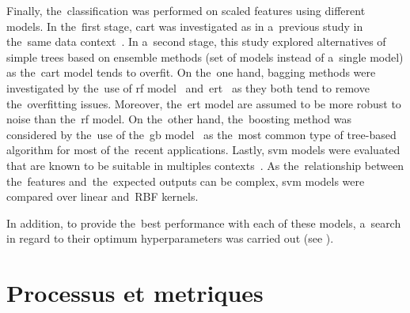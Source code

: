 Finally, the~classification was performed on scaled features using different models. In the~first stage, \ac{cart} was investigated as in a~previous study in the~same data context~\cite{Wiltgen2008}. In a~second stage, this study explored alternatives of simple trees based on ensemble methods (set of models instead of a~single model) as the~\ac{cart} model tends to overfit. On the~one hand, bagging methods were investigated by the~use of \ac{rf} model~\cite{Breiman2001} and~\ac{ert}~\cite{Geurts2006} as they both tend to remove the~overfitting issues. Moreover, the~\ac{ert} model are assumed to be more robust to noise than the~\ac{rf} model. On the~other hand, the~boosting method was considered by the~use of the~\ac{gb} model~\cite{Friedman2000} as the~most common type of tree-based algorithm for most of the~recent applications. Lastly, \ac{svm} models were evaluated that are known to be suitable in multiples contexts~\cite{Smach2008a,Kose2016b}. As the~relationship between the~features and~the~expected outputs can be complex, \ac{svm} models were compared over linear and~RBF kernels.\par
In addition, to provide the~best performance with each of these models, a~search in regard to their optimum hyperparameters was carried out (see ).\par

\section{Processus et metriques}

